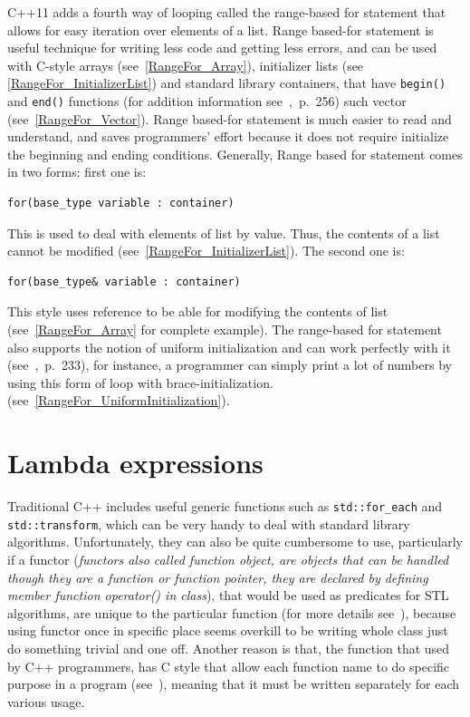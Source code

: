 \documentclass[11pt]{report}
\begin{document}
C++11 adds a fourth way of looping called the range-based for statement that allows for easy iteration over elements of a list. Range based-for statement is useful technique for writing less code and getting less errors, and can be used with C-style arrays (see~\ref{RangeFor_Array}), initializer lists (see \ref{RangeFor_InitializerList}) and standard library containers, that have \texttt{begin()} and \texttt{end()} functions (for addition information see~\cite{Overland:2011:CWF},~p.~256) such vector (see~\ref{RangeFor_Vector}). Range based-for statement is much easier to read and understand, and saves programmers' effort because it does not require initialize the beginning and ending conditions. Generally, Range based for statement comes in two forms: first one is:
\begin{lstlisting}
for(base_type variable : container)
\end{lstlisting} 
This is used to deal with elements of list by value. Thus, the contents of a list cannot be modified (see~\ref{RangeFor_InitializerList}). The second one is:
\begin{lstlisting}
for(base_type& variable : container)
\end{lstlisting}
This style uses reference to be able for modifying the contents of list (see~\ref{RangeFor_Array} for complete example). The range-based for statement also supports the notion of uniform initialization and can work perfectly with it (see~\cite{Prata:2012:Cpp},~p.~233), for instance, a programmer can simply print a lot of numbers by using this form of loop with brace-initialization. (see~\ref{RangeFor_UniformInitialization}).

\section{Lambda expressions}
\label{section: Lambda Expressions}
Traditional C++ includes useful generic functions such as \texttt{std::for\_each} and \texttt{std::transform}, which can be very handy to deal with standard library algorithms. Unfortunately, they can also be quite cumbersome to use, particularly if a functor (\emph{functors also called function object, are objects that can be handled though they are a function or function pointer, they are declared by defining member function operator() in class}), that would be used as predicates for STL algorithms, are unique to the particular function (for more details see~\cite{Allain:2011:FutureCpp}), because using functor once in specific place seems overkill to be writing whole class just do something trivial and one off. Another reason is that, the function that used by C++ programmers, has C style that allow each function name to do specific purpose in a program (see~\cite{Cppreference:2012:Cpp11}), meaning that it must be written separately for each various usage.
\end{document}
